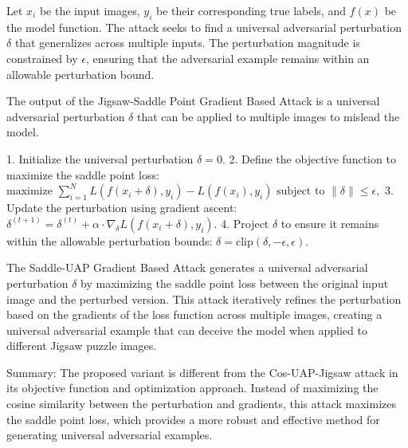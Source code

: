 Let \( x_i \) be the input images, \( y_i \) be their corresponding true labels, and \( f(x) \) be the model function. The attack seeks to find a universal adversarial perturbation \( \delta \) that generalizes across multiple inputs. The perturbation magnitude is constrained by \( \epsilon \), ensuring that the adversarial example remains within an allowable perturbation bound.


The output of the Jigsaw-Saddle Point Gradient Based Attack is a universal adversarial perturbation $ \delta $ that can be applied to multiple images to mislead the model.

1. Initialize the universal perturbation \( \delta = 0. \)
2. Define the objective function to maximize the saddle point loss:
   $
   \text{maximize } \sum_{i=1}^{N} L(f(x_i + \delta), y_i) - L(f(x_i), y_i) \text{ subject to } \|\delta\| \leq \epsilon,
   $
3. Update the perturbation using gradient ascent:
   $
   \delta^{(t+1)} = \delta^{(t)} + \alpha \cdot \nabla_{\delta} L(f(x_i + \delta), y_i).
   $
4. Project \( \delta \) to ensure it remains within the allowable perturbation bounds:
   $
   \delta = \text{clip}(\delta, -\epsilon, \epsilon).
   $

The Saddle-UAP Gradient Based Attack generates a universal adversarial perturbation $ \delta $ by maximizing the saddle point loss between the original input image and the perturbed version. This attack iteratively refines the perturbation based on the gradients of the loss function across multiple images, creating a universal adversarial example that can deceive the model when applied to different Jigsaw puzzle images.

Summary: The proposed variant is different from the Cos-UAP-Jigsaw attack in its objective function and optimization approach. Instead of maximizing the cosine similarity between the perturbation and gradients, this attack maximizes the saddle point loss, which provides a more robust and effective method for generating universal adversarial examples.